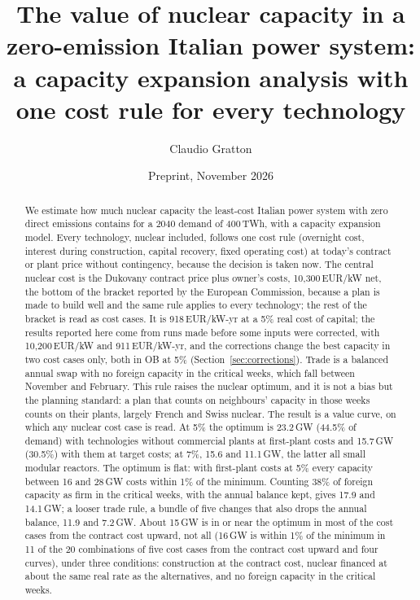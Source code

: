 \documentclass[11pt,a4paper]{article}
\title{The value of nuclear capacity in a zero-emission Italian power system: a capacity expansion analysis with one cost rule for every technology}
\author{Claudio Gratton}
\affil{Independent researcher, Italy}
\date{Preprint, November 2026}
\begin{document}
\maketitle

\begin{abstract}
\noindent We estimate how much nuclear capacity the least-cost Italian power system with zero direct emissions contains for a 2040 demand of 400\,TWh, with a capacity expansion model. Every technology, nuclear included, follows one cost rule (overnight cost, interest during construction, capital recovery, fixed operating cost) at today's contract or plant price without contingency, because the decision is taken now. The central nuclear cost is the Dukovany contract price plus owner's costs, 10{,}300\,EUR/kW net, the bottom of the bracket reported by the European Commission, because a plan is made to build well and the same rule applies to every technology; the rest of the bracket is read as cost cases. It is 918\,EUR/kW-yr at a 5\% real cost of capital; the results reported here come from runs made before some inputs were corrected, with 10{,}200\,EUR/kW and 911\,EUR/kW-yr, and the corrections change the best capacity in two cost cases only, both in OB at 5\% (Section~\ref{sec:corrections}). Trade is a balanced annual swap with no foreign capacity in the critical weeks, which fall between November and February. This rule raises the nuclear optimum, and it is not a bias but the planning standard: a plan that counts on neighbours' capacity in those weeks counts on their plants, largely French and Swiss nuclear. The result is a value curve, on which any nuclear cost case is read. At 5\% the optimum is 23.2\,GW (44.5\% of demand) with technologies without commercial plants at first-plant costs and 15.7\,GW (30.5\%) with them at target costs; at 7\%, 15.6 and 11.1\,GW, the latter all small modular reactors. The optimum is flat: with first-plant costs at 5\% every capacity between 16 and 28\,GW costs within 1\% of the minimum. Counting 38\% of foreign capacity as firm in the critical weeks, with the annual balance kept, gives 17.9 and 14.1\,GW; a looser trade rule, a bundle of five changes that also drops the annual balance, 11.9 and 7.2\,GW. About 15\,GW is in or near the optimum in most of the cost cases from the contract cost upward, not all (16\,GW is within 1\% of the minimum in 11 of the 20 combinations of five cost cases from the contract cost upward and four curves), under three conditions: construction at the contract cost, nuclear financed at about the same real rate as the alternatives, and no foreign capacity in the critical weeks.
\end{abstract}
\end{document}
